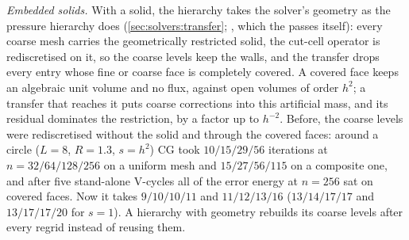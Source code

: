 \emph{Embedded solids.} With a solid, the hierarchy takes the solver's
geometry as the pressure hierarchy does (\cref{sec:solvers:transfer};
, which the
 passes itself): every coarse mesh carries the
geometrically restricted solid, the cut-cell operator is rediscretised on it,
so the coarse levels keep the walls, and the transfer drops every entry whose
fine or coarse face is completely covered. A covered face keeps an algebraic
unit volume and no flux, against open volumes of order $h^2$; a transfer that
reaches it puts coarse corrections into this artificial mass, and its residual
dominates the restriction, by a factor up to $h^{-2}$. Before, the coarse
levels were rediscretised without the solid and through the covered faces:
around a circle ($L=8$, $R=1.3$, $s=h^2$) CG took $10/15/29/56$ iterations at
$n=32/64/128/256$ on a uniform mesh and $15/27/56/115$ on a composite one,
and after five stand-alone V-cycles all of the error energy at $n=256$ sat on
covered faces. Now it takes $9/10/10/11$ and $11/12/13/16$ ($13/14/17/17$ and
$13/17/17/20$ for $s=1$). A hierarchy with geometry rebuilds its coarse levels
after every regrid instead of reusing them.

